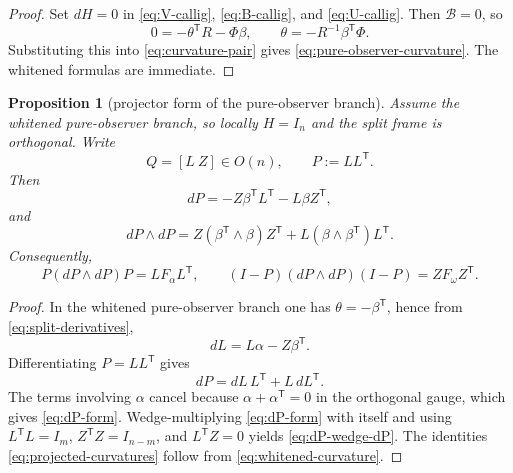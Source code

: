 \documentclass[11pt,a4paper]{article}
\numberwithin{equation}{section}
\theoremstyle{thmcompact}
\newtheorem{proposition}[theorem]{Proposition}
\theoremstyle{remark}
\begin{document}
\begin{proof}
Set $dH=0$ in \eqref{eq:V-callig}, \eqref{eq:B-callig}, and \eqref{eq:U-callig}. Then $\mathcal B=0$, so
\[
0=-\theta^{\mathsf T}R-\Phi\beta,
\qquad
\theta=-R^{-1}\beta^{\mathsf T}\Phi.
\]
Substituting this into \eqref{eq:curvature-pair} gives \eqref{eq:pure-observer-curvature}. The whitened formulas are immediate.
\end{proof}

\begin{proposition}[projector form of the pure-observer branch]\label{prop:projector-form}
Assume the whitened pure-observer branch, so locally $H=I_n$ and the split frame is orthogonal. Write
\[
Q=[L\ Z]\in O(n),
\qquad
P:=LL^{\mathsf T}.
\]
Then
\begin{equation}
dP=-Z\beta^{\mathsf T}L^{\mathsf T}-L\beta Z^{\mathsf T},
\label{eq:dP-form}
\end{equation}
and
\begin{equation}
dP\wedge dP
=
Z(\beta^{\mathsf T}\wedge\beta)Z^{\mathsf T}
+
L(\beta\wedge\beta^{\mathsf T})L^{\mathsf T}.
\label{eq:dP-wedge-dP}
\end{equation}
Consequently,
\begin{equation}
P(dP\wedge dP)P=LF_{\alpha}L^{\mathsf T},
\qquad
(I-P)(dP\wedge dP)(I-P)=ZF_{\omega}Z^{\mathsf T}.
\label{eq:projected-curvatures}
\end{equation}
\end{proposition}

\begin{proof}
In the whitened pure-observer branch one has $\theta=-\beta^{\mathsf T}$, hence from \eqref{eq:split-derivatives},
\[
dL=L\alpha-Z\beta^{\mathsf T}.
\]
Differentiating $P=LL^{\mathsf T}$ gives
\[
dP=dL\,L^{\mathsf T}+L\,dL^{\mathsf T}.
\]
The terms involving $\alpha$ cancel because $\alpha+\alpha^{\mathsf T}=0$ in the orthogonal gauge, which gives \eqref{eq:dP-form}. Wedge-multiplying \eqref{eq:dP-form} with itself and using $L^{\mathsf T}L=I_m$, $Z^{\mathsf T}Z=I_{n-m}$, and $L^{\mathsf T}Z=0$ yields \eqref{eq:dP-wedge-dP}. The identities \eqref{eq:projected-curvatures} follow from \eqref{eq:whitened-curvature}.
\end{proof}
\end{document}
